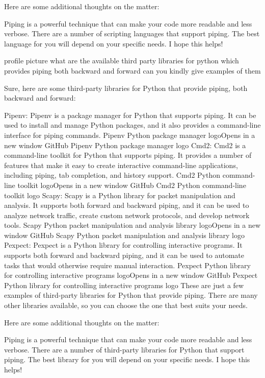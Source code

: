 \documentclass[11pt]{article}
\begin{document}
Here are some additional thoughts on the matter:

Piping is a powerful technique that can make your code more readable and less verbose.
There are a number of scripting languages that support piping.
The best language for you will depend on your specific needs.
I hope this helps!

profile picture
what are the available third party libraries for python
which provides
piping
both backward and forward
can you kindly give examples of them

Sure, here are some third-party libraries for Python that provide piping, both backward and forward:

Pipenv: Pipenv is a package manager for Python that supports piping. It can be used to install and manage Python packages, and it also provides a command-line interface for piping commands.
Pipenv Python package manager logoOpens in a new window
GitHub
Pipenv Python package manager logo
Cmd2: Cmd2 is a command-line toolkit for Python that supports piping. It provides a number of features that make it easy to create interactive command-line applications, including piping, tab completion, and history support.
Cmd2 Python command-line toolkit logoOpens in a new window
GitHub
Cmd2 Python command-line toolkit logo
Scapy: Scapy is a Python library for packet manipulation and analysis. It supports both forward and backward piping, and it can be used to analyze network traffic, create custom network protocols, and develop network tools.
Scapy Python packet manipulation and analysis library logoOpens in a new window
GitHub
Scapy Python packet manipulation and analysis library logo
Pexpect: Pexpect is a Python library for controlling interactive programs. It supports both forward and backward piping, and it can be used to automate tasks that would otherwise require manual interaction.
Pexpect Python library for controlling interactive programs logoOpens in a new window
GitHub
Pexpect Python library for controlling interactive programs logo
These are just a few examples of third-party libraries for Python that provide piping. There are many other libraries available, so you can choose the one that best suits your needs.

Here are some additional thoughts on the matter:

Piping is a powerful technique that can make your code more readable and less verbose.
There are a number of third-party libraries for Python that support piping.
The best library for you will depend on your specific needs.
I hope this helps!
\end{document}
